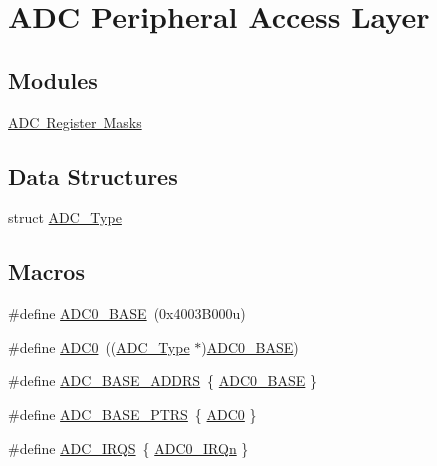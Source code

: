 \hypertarget{group___a_d_c___peripheral___access___layer}{}\section{A\+DC Peripheral Access Layer}
\label{group___a_d_c___peripheral___access___layer}
\subsection*{Modules}
\begin{DoxyCompactItemize}
\item 
\mbox{\hyperlink{group___a_d_c___register___masks}{A\+D\+C Register Masks}}
\end{DoxyCompactItemize}
\subsection*{Data Structures}
\begin{DoxyCompactItemize}
\item 
struct \mbox{\hyperlink{struct_a_d_c___type}{A\+D\+C\+\_\+\+Type}}
\end{DoxyCompactItemize}
\subsection*{Macros}
\begin{DoxyCompactItemize}
\item 
\#define \mbox{\hyperlink{group___a_d_c___peripheral___access___layer_ga0aa6c0c068af7a61c770bc6d4322d63e}{A\+D\+C0\+\_\+\+B\+A\+SE}}~(0x4003\+B000u)
\item 
\#define \mbox{\hyperlink{group___a_d_c___peripheral___access___layer_ga0d2ea0f4a8dd17bf08e69d05deacbcb5}{A\+D\+C0}}~((\mbox{\hyperlink{struct_a_d_c___type}{A\+D\+C\+\_\+\+Type}} $\ast$)\mbox{\hyperlink{group___a_d_c___peripheral___access___layer_ga0aa6c0c068af7a61c770bc6d4322d63e}{A\+D\+C0\+\_\+\+B\+A\+SE}})
\item 
\#define \mbox{\hyperlink{group___a_d_c___peripheral___access___layer_gaf635223a5796d02fc2f731139925696d}{A\+D\+C\+\_\+\+B\+A\+S\+E\+\_\+\+A\+D\+D\+RS}}~\{ \mbox{\hyperlink{group___a_d_c___peripheral___access___layer_ga0aa6c0c068af7a61c770bc6d4322d63e}{A\+D\+C0\+\_\+\+B\+A\+SE}} \}
\item 
\#define \mbox{\hyperlink{group___a_d_c___peripheral___access___layer_gaaa8175a3a2f4efaceeed5bd26c0b2d3f}{A\+D\+C\+\_\+\+B\+A\+S\+E\+\_\+\+P\+T\+RS}}~\{ \mbox{\hyperlink{group___a_d_c___peripheral___access___layer_ga0d2ea0f4a8dd17bf08e69d05deacbcb5}{A\+D\+C0}} \}
\item 
\#define \mbox{\hyperlink{group___a_d_c___peripheral___access___layer_ga87c1a48633af604e5c7c6a64383398b9}{A\+D\+C\+\_\+\+I\+R\+QS}}~\{ \mbox{\hyperlink{group___interrupt__vector__numbers_gga666eb0caeb12ec0e281415592ae89083a08b6c660bfe015ac0842ca95510420eb}{A\+D\+C0\+\_\+\+I\+R\+Qn}} \}
\end{DoxyCompactItemize}


